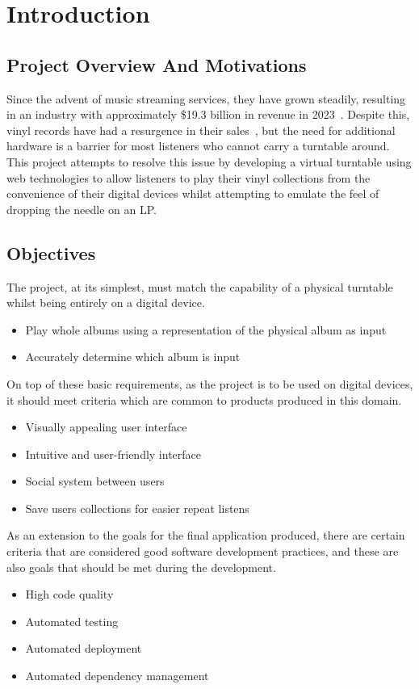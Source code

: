 \chapter{Introduction}\label{cha:intro}

\section{Project Overview And Motivations}
Since the advent of music streaming services, they have grown steadily, resulting in an industry with approximately \$19.3 billion in revenue in 2023~\cite{IFPI}. Despite this, vinyl records have had a resurgence in their sales~\cite{BPI}, but the need for additional hardware is a barrier for most listeners who cannot carry a turntable around. This project attempts to resolve this issue by developing a virtual turntable using web technologies to allow listeners to play their vinyl collections from the convenience of their digital devices whilst attempting to emulate the feel of dropping the needle on an LP.\@

\section{Objectives}\label{sec:objectives}
The project, at its simplest, must match the capability of a physical turntable whilst being entirely on a digital device.
\begin{itemize}
    \item Play whole albums using a representation of the physical album as input
    \item Accurately determine which album is input
\end{itemize}
On top of these basic requirements, as the project is to be used on digital devices, it should meet criteria which are common to products produced in this domain.
\begin{itemize}
    \item Visually appealing user interface
    \item Intuitive and user-friendly interface
    \item Social system between users
    \item Save users collections for easier repeat listens
\end{itemize}
As an extension to the goals for the final application produced, there are certain criteria that are considered good software development practices, and these are also goals that should be met during the development.
\begin{itemize}
    \item High code quality
    \item Automated testing
    \item Automated deployment
    \item Automated dependency management
\end{itemize}

